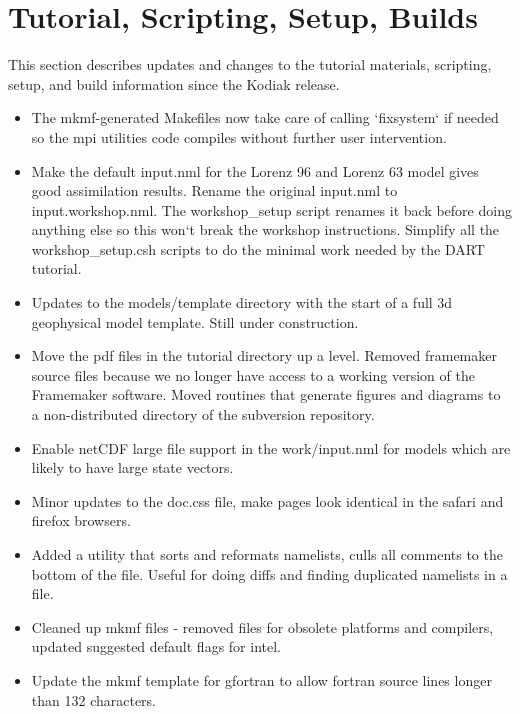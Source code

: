 \documentclass[letterpaper,10pt,english]{sphinxmanual}
\begin{document}
\section{Tutorial, Scripting, Setup, Builds}
\label{docs/Lanai_diffs_from_Kodiak:tutorial-scripting-setup-builds}
This section describes updates and changes to the tutorial materials,
scripting, setup, and build information since the Kodiak release.
\begin{itemize}
\item {} 
The mkmf-generated Makefiles now take care of calling `fixsystem` if
needed so the mpi utilities code compiles without further user
intervention.

\item {} 
Make the default input.nml for the Lorenz 96 and Lorenz 63 model
gives good assimilation results. Rename the original input.nml to
input.workshop.nml. The workshop\_setup script renames it back
before doing anything else so this won`t break the workshop
instructions. Simplify all the workshop\_setup.csh scripts to do the
minimal work needed by the DART tutorial.

\item {} 
Updates to the models/template directory with the start of a full 3d
geophysical model template. Still under construction.

\item {} 
Move the pdf files in the tutorial directory up a level. Removed
framemaker source files because we no longer have access to a
working version of the Framemaker software. Moved routines that
generate figures and diagrams to a non-distributed directory of the
subversion repository.

\item {} 
Enable netCDF large file support in the work/input.nml for models
which are likely to have large state vectors.

\item {} 
Minor updates to the doc.css file, make pages look identical in the
safari and firefox browsers.

\item {} 
Added a utility that sorts and reformats namelists, culls all
comments to the bottom of the file. Useful for doing diffs and
finding duplicated namelists in a file.

\item {} 
Cleaned up mkmf files - removed files for obsolete platforms and
compilers, updated suggested default flags for intel.

\item {} 
Update the mkmf template for gfortran to allow fortran source lines
longer than 132 characters.

\end{itemize}
\end{document}
